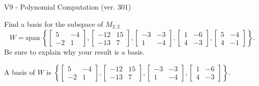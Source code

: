 \begin{exercise}
  \begin{exerciseTitle}V9 - Polynomial Computation (ver. 301)\end{exerciseTitle}
  \begin{exerciseStatement}
    Find a basis for the subspace of \(M_{2,2}\) 
\[W=\mathrm{span}\ \left\{\left[\begin{array}{cc}
5 & -4 \\
-2 & 1
\end{array}\right] , \left[\begin{array}{cc}
-12 & 15 \\
-13 & 7
\end{array}\right] , \left[\begin{array}{cc}
-3 & -3 \\
1 & -4
\end{array}\right] , \left[\begin{array}{cc}
1 & -6 \\
4 & -3
\end{array}\right] , \left[\begin{array}{cc}
5 & -4 \\
4 & -1
\end{array}\right]\right\}.\]
 Be sure to explain why your result is a basis.


  \end{exerciseStatement}
  \begin{exerciseAnswer}
   A basis of \(W\) is  \(\left\{\left[\begin{array}{cc}
5 & -4 \\
-2 & 1
\end{array}\right] , \left[\begin{array}{cc}
-12 & 15 \\
-13 & 7
\end{array}\right] , \left[\begin{array}{cc}
-3 & -3 \\
1 & -4
\end{array}\right] , \left[\begin{array}{cc}
1 & -6 \\
4 & -3
\end{array}\right]\right\}\).
  


  \end{exerciseAnswer}
\end{exercise}